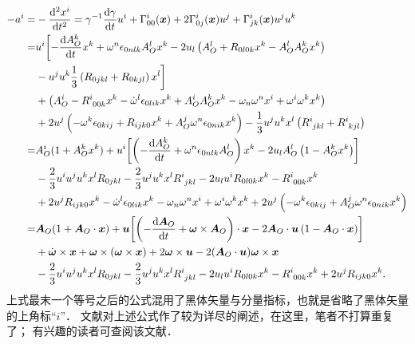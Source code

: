 \begin{align*}
    -a^i =& -\frac{{\rm d}^2 x^i}{{\rm d} t^2}
    =\gamma^{-1} \frac{{\rm d} \gamma}{{\rm d} t} u^i
    +\Gamma_{00}^i(\boldsymbol{x}) +2\Gamma_{0j}^i(\boldsymbol{x})u^j
     +\Gamma_{jk}^i(\boldsymbol{x})  u^j u^k \\
    =&  u^i \biggl[-\frac{{\rm d}A_{O}^k}{{\rm d}t}x^k + \omega^n \epsilon_{0nlk} A_{O}^l x^k
    - 2 u_l \left(A^l_O + R_{0 l 0 k} x^k - A_{O}^l A_{O}^k x^k \right) \\
    &- u^j u^k \frac{1}{3} \left(  {R}_{0 jkl} +{R}_{0 kjl}   \right)x^l\biggr]\\
    &+\left(A_{O}^i -R_{\hphantom{i} 00k}^i x^k-
    \dot{\omega}^l \epsilon_{0lik}x^k + A_{O}^i A_{O}^kx^k
    - \omega_n \omega^n  x^i+ \omega^i \omega^k x^k  \right) \\
    &+2u^j \left( - \omega^k \epsilon_{0kij}
     + R_{i j k 0}x^k + A_{O}^j \omega^n \epsilon_{0nik} x^k\right) 
    - \frac{1}{3} u^j u^k x^l \left(
    {R}_{\hphantom{i} jkl}^i  +{R}_{\hphantom{i} kjl}^i \right)  \\
    =& A_{O}^i (1 +  A_{O}^kx^k) 
     +u^i \biggl[\left(-\frac{{\rm d}A_{O}^k}{{\rm d}t}
      + \omega^n \epsilon_{0nlk} A_{O}^l\right) x^k
    - 2 u_l A^l_O \left( 1 -  A_{O}^k x^k \right)\biggr] \\
    &   - \frac{2}{3}u^i u^j u^k x^l {R}_{0 jkl}
    - \frac{2}{3} u^j u^k x^l {R}_{\hphantom{i} jkl}^i
    - 2 u_l u^i R_{0 l 0 k} x^k -R_{\hphantom{i} 00k}^i x^k\\
    &+2u^j R_{i j k 0}x^k 
    - \dot{\omega}^l \epsilon_{0lik}x^k
    - \omega_n \omega^n  x^i+ \omega^i \omega^k x^k
    +2u^j \left( - \omega^k \epsilon_{0kij}
    + A_{O}^j \omega^n \epsilon_{0nik} x^k\right) \\
    =& \boldsymbol{A}_{O} (1 +  \boldsymbol{A}_{O}\cdot \boldsymbol{x})
     +\boldsymbol{u} \biggl[\left(-\frac{{\rm d}\boldsymbol{A}_{O}}{{\rm d}t}
    + \boldsymbol{\omega}\times \boldsymbol{A}_{O} \right) \cdot \boldsymbol{x}
    - 2 \boldsymbol{A}_{O}\cdot \boldsymbol{u} 
    \left( 1 -  \boldsymbol{A}_{O}\cdot \boldsymbol{x} \right)\biggr] \\
    & +  \dot{\boldsymbol{\omega}} \times \boldsymbol{x}
    + \boldsymbol{\omega} \times (\boldsymbol{\omega} \times \boldsymbol{x})
    + 2 \boldsymbol{\omega} \times \boldsymbol{u}
    - 2(\boldsymbol{A}_{O}\cdot \boldsymbol{u})  \boldsymbol{\omega} \times \boldsymbol{x}  \\
        &   - \frac{2}{3}u^i u^j u^k x^l {R}_{0 jkl}
    - \frac{2}{3} u^j u^k x^l {R}_{\hphantom{i} jkl}^i
    - 2 u_l u^i R_{0 l 0 k} x^k -R_{\hphantom{i} 00k}^i x^k
    +2u^j R_{i j k 0}x^k .
\end{align*}\setlength{\mathindent}{2em}
上式最末一个等号之后的公式混用了黑体矢量与分量指标，也就是省略了黑体矢量的上角标“$i$”．
文献\parencite{niwt-1978}对上述公式作了较为详尽的阐述，在这里，笔者不打算重复了；
有兴趣的读者可查阅该文献．

